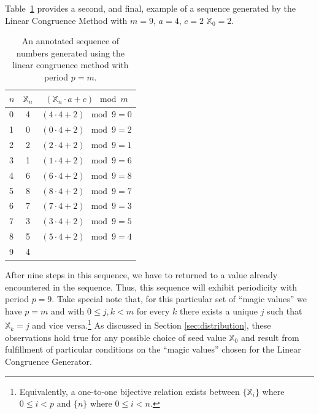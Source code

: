 \documentclass{article}
\theoremstyle{break}
\begin{document}
Table~\ref{long_period_comp_examp} provides a second, and final, example of a sequence generated by the Linear Congruence Method with $m = 9$, $a = 4$, $c = 2$ $\mathbb{X}_0 = 2$.
\begin{table}[htbp]
\centering
\begin{tabular}{l|c|c}
$n$ & $\mathbb{X}_n$ & $(\mathbb{X}_n \cdot a + c) \mod m$  \\\hline
0 & 4 &  $(4 \cdot 4 + 2) \mod 9 = 0$ \\
1 & 0 & $(0 \cdot 4 + 2) \mod 9 = 2$ \\
2 & 2 & $(2 \cdot 4 + 2) \mod 9 = 1$ \\
3 & 1 & $(1 \cdot 4 + 2) \mod 9 = 6$ \\
4 & 6 & $(6 \cdot 4 + 2) \mod 9 = 8$ \\
5 & 8 & $(8 \cdot 4 + 2) \mod 9 = 7$ \\
6 & 7 & $(7 \cdot 4 + 2) \mod 9 = 3$ \\
7 & 3 & $(3 \cdot 4 + 2) \mod 9 = 5$ \\
8 & 5 & $(5 \cdot 4 + 2) \mod 9 = 4$ \\
9 & 4 & \\
\end{tabular}
\caption{An annotated sequence of numbers generated using the linear congruence method with period $p = m$.}
\label{long_period_comp_examp}
\end{table}
After nine steps in this sequence, we have to returned to a value already encountered in the sequence. Thus, this sequence will exhibit periodicity with period $p = 9$. Take special note that, for this particular set of ``magic values'' we have $p = m$ and with $0 \leq j,k < m$ for every $k$ there exists a unique $j$ such that $\mathbb{X}_k = j$ and vice versa.\footnote{Equivalently, a one-to-one bijective relation exists between $\{\mathbb{X}_i\}$ where $0 \leq i < p$ and $\{n\}$ where $0 \leq i < n$.} As discussed in Section \ref{sec:distribution}, these observations hold true for any possible choice of seed value $\mathbb{X}_0$ and result from fulfillment of particular conditions on the ``magic values'' chosen for the Linear Congruence Generator.
\end{document}
